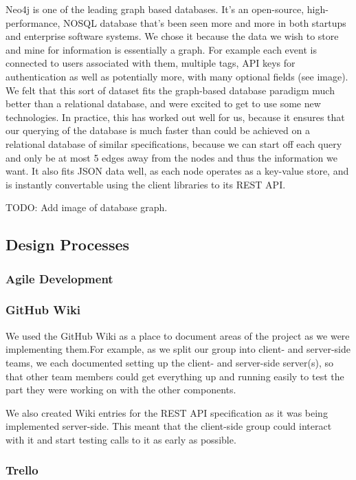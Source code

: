 \documentclass[11pt]{article}
\begin{document}
Neo4j is one of the leading graph based databases. It's an open-source, high-performance, NOSQL database that's been seen more and more in both startups and enterprise software systems. We chose it because the data we wish to store and mine for information is essentially a graph. For example each event is connected to users associated with them, multiple tags, API keys for authentication as well as potentially more, with many optional fields (see image). We felt that this sort of dataset fits the graph-based database paradigm much better than a relational database, and were excited to get to use some new technologies. In practice, this has worked out well for us, because it ensures that our querying of the database is much faster than could be achieved on a relational database of similar specifications, because we can start off each query and only be at most 5 edges away from the nodes and thus the information we want. It also fits JSON data well, as each node operates as a key-value store, and is instantly convertable using the client libraries to its REST API.

TODO: Add image of database graph.
\subsection {Design Processes}

\subsubsection {Agile Development}
\subsubsection {GitHub Wiki}
We used the GitHub Wiki as a place to document areas of the project as we were implementing them.For example, as we split our group into client- and server-side teams, we each documented setting up the client- and server-side server(s), so that other team members could get everything up and running easily to test the part they were working on with the other components.

We also created Wiki entries for the REST API specification as it was being implemented server-side. This meant that the client-side group could interact with it and start testing calls to it as early as possible.
\subsubsection {Trello}
\end{document}
